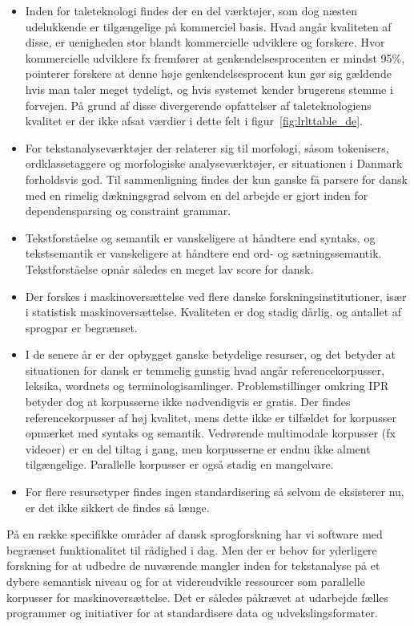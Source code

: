 \begin{multicols}{2}
 \begin{itemize}
      \item Inden for taleteknologi findes der en del v\ae rkt\o jer, som dog n\ae sten udelukkende er tilg\ae ngelige \mbox{p\aa} kommerciel basis. Hvad ang\aa r kvaliteten af disse, er uenigheden stor blandt kommercielle udviklere og forskere. Hvor kommercielle udviklere fx fremf\o rer at genkendelsesprocenten er mindst 95\%, poin\-terer forskere at denne h\o je genkendelsesprocent kun g\o r sig g\ae ldende hvis man taler meget tydeligt, og hvis systemet kender brugerens stemme i forvejen. \mbox{P\aa} grund af disse divergerende opfattelser af taletek\-nologiens kvalitet er der ikke afsat v\ae rdier i dette felt i figur~\ref{fig:lrlttable_de}.
\item For tekstanalysev\ae rkt\o jer der relaterer sig til morfologi, \mbox{s\aa}som tokenisers, ordklassetaggere og morfo\-logiske analysev\ae rkt\o jer, er situationen i Danmark forholdsvis god. Til sammenligning findes der kun ganske \mbox{f\aa} parsere for dansk med en rimelig d\ae kningsgrad selvom en del arbejde er gjort inden for dependensparsing og constraint grammar.
\item \sloppy Tekstforst\aa else og semantik er vanskeligere at h\aa ndtere end syntaks, og tekstsemantik er vanskeligere at h\aa ndtere end ord- og s\ae tningssemantik. Tekstforst\aa else opn\aa r s\aa ledes en meget lav score for dansk. 
\item Der forskes i maskinovers\ae ttelse ved flere danske forskningsinstitutioner, is\ae r i statistisk maskinovers\ae ttelse. Kvaliteten er dog stadig d\aa rlig, og antallet af sprogpar er begr\ae nset. 
\item I de senere \aa r er der opbygget ganske betydelige resurser, og det betyder at situationen for dansk er temmelig gunstig hvad ang\aa r referencekorpusser, leksika, wordnets og terminologisamlinger. Pro\-blemstillinger omkring IPR betyder dog at korpusserne ikke n\o dvendigvis er gratis. Der findes referencekorpusser af h\o j kvalitet, mens dette ikke er tilf\ae ldet for korpusser opm\ae rket med syntaks og semantik. Vedr\o rende multimodale korpusser (fx videoer) er en del tiltag i gang, men korpusserne er endnu ikke alment tilg\ae ngelige. Parallelle korpusser er \mbox{ogs\aa} stadig en mangelvare. 
\item For flere resursetyper findes ingen standardisering \mbox{s\aa} selvom de eksisterer nu, er det ikke sikkert de findes \mbox{s\aa} l\ae nge.
\end{itemize}
\mbox{P\aa}  en r\ae kke specifikke omr\aa der af dansk sprogforsk\-ning har vi software med begr\ae nset funktionalitet til r\aa dighed i dag. Men der er behov for yderligere forsk\-ning for at udbedre de nuv\ae rende  mangler inden for tekstanalyse \mbox{p\aa} et dybere semantisk niveau og for at videreudvikle ressourcer som parallelle korpusser for maskinoversættelse.
Det er s\aa ledes p\aa kr\ae vet at udarbej\-de f\ae lles programmer og initiativer for at standardisere data og udvekslingsformater. 


\end{multicols}
